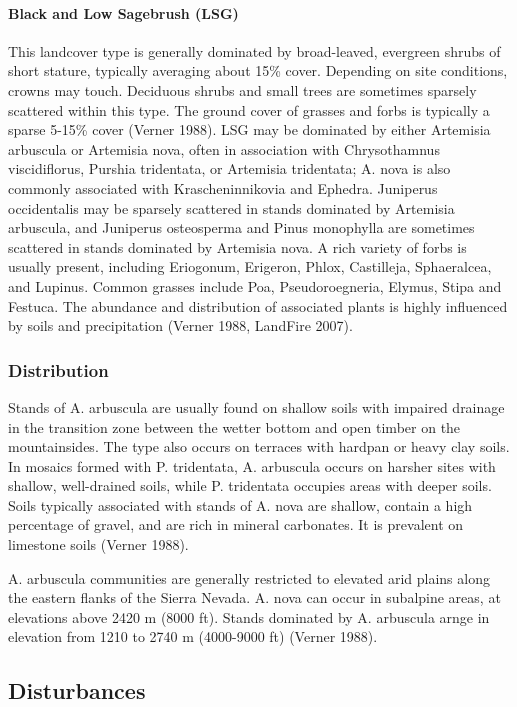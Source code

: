 \paragraph{Black and Low Sagebrush (LSG)}	This landcover type is generally dominated by broad-leaved, evergreen shrubs of short stature, typically averaging about 15\% cover. Depending on site conditions, crowns may touch. Deciduous shrubs and small trees are sometimes sparsely scattered within this type. The ground cover of grasses and forbs is typically a sparse 5-15\% cover (Verner 1988). LSG may be dominated by either Artemisia arbuscula or Artemisia nova, often in association with Chrysothamnus viscidiflorus, Purshia tridentata, or Artemisia tridentata; A. nova is also commonly associated with Krascheninnikovia and Ephedra. Juniperus occidentalis may be sparsely scattered in stands dominated by Artemisia arbuscula, and Juniperus osteosperma and Pinus monophylla are sometimes scattered in stands dominated by Artemisia nova. A rich variety of forbs is usually present, including Eriogonum, Erigeron, Phlox, Castilleja, Sphaeralcea, and Lupinus. Common grasses include Poa, Pseudoroegneria, Elymus, Stipa and Festuca. The abundance and distribution of associated plants is highly influenced by soils and precipitation (Verner 1988, LandFire 2007).

\subsubsection{Distribution}
Stands of A. arbuscula are usually found on shallow soils with impaired drainage in the transition zone between the wetter bottom and open timber on the mountainsides. The type also occurs on terraces with hardpan or heavy clay soils. In mosaics formed with P. tridentata, A. arbuscula occurs on harsher sites with shallow, well-drained soils, while P. tridentata occupies areas with deeper soils. Soils typically associated with stands of A. nova are shallow, contain a high percentage of gravel, and are rich in mineral carbonates. It is prevalent on limestone soils (Verner 1988).

A. arbuscula communities are generally restricted to elevated arid plains along the eastern flanks of the Sierra Nevada. A. nova can occur in subalpine areas, at elevations above 2420 m (8000 ft). Stands dominated by A. arbuscula arnge in elevation from 1210 to 2740 m (4000-9000 ft) (Verner 1988).


\subsection*{Disturbances}

